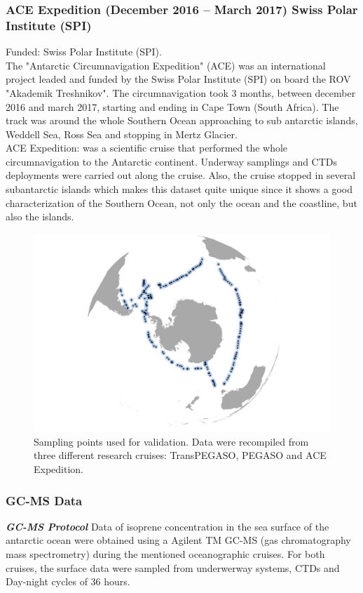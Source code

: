\documentclass[draft,linenumbers]{agujournal}
\begin{document}
\subsubsection{ACE Expedition  (December 2016 -- March 2017) Swiss Polar Institute (SPI) }
Funded: Swiss Polar Institute (SPI).\\
The "Antarctic Circumnavigation Expedition" (ACE) was an international project leaded and funded by the Swiss Polar Institute (SPI) on board the ROV "Akademik Treshnikov".
The circumnavigation took 3 months, between december 2016 and march 2017, starting and ending in Cape Town (South Africa).
The track was around the whole Southern Ocean approaching to sub antarctic islands, Weddell Sea, Ross Sea and stopping in Mertz Glacier. \\
ACE Expedition: was a scientific cruise that performed the whole circumnavigation to the Antarctic continent.
Underway samplings and CTDs deployments were carried out along the cruise.
Also, the cruise stopped in several subantarctic islands which makes this dataset quite unique since it shows a good characterization of the Southern Ocean, not only the ocean and the coastline, but also the islands. \\

\begin{figure}[h]
\centering
\includegraphics[width=.8\textwidth]{Plots/validation_isoprene_roms_bec_ant.png}
\caption{Sampling points used for validation. Data were recompiled from three different research cruises: TransPEGASO, PEGASO and ACE Expedition. }
\label{fig:cruises}
\end{figure}

\subsubsection{GC-MS Data}
\textbf{\textit{GC-MS Protocol}}
Data of isoprene concentration in the sea surface of the antarctic ocean were obtained using a Agilent TM GC-MS (gas chromatography mass spectrometry) during the mentioned oceanographic cruises. For both cruises, the surface data were sampled from underwerway systems, CTDs and Day-night cycles of 36 hours. \\
\end{document}
